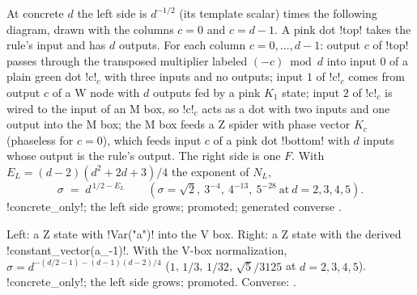 At concrete $d$ the left side is $d^{-1/2}$ (its template scalar) times the following diagram,
drawn with the columns $c=0$ and $c=d-1$. A pink dot \code!top! takes the rule's input and has
$d$ outputs. For each column $c=0,\dots,d-1$: output $c$ of \code!top! passes through the
transposed multiplier labeled $(-c)\bmod d$ into input $0$ of a plain green dot \code!c!$_c$ with
three inputs and no outputs; input $1$ of \code!c!$_c$ comes from output $c$ of a W node with $d$
outputs fed by a pink $K_1$ state; input $2$ of \code!c!$_c$ is wired to the input of an M box, so
\code!c!$_c$ acts as a dot with two inputs and one output into the M box; the M box feeds a Z
spider with phase vector $K_c$ (phaseless for $c=0$), which feeds input $c$ of a pink dot
\code!bottom! with $d$ inputs whose output is the rule's output. The right side is one $F$. With
$E_L=(d-2)(d^2+2d+3)/4$ the exponent of $N_L$,
\[
\sigma \;=\; d^{\,1/2-E_L}\qquad(\sigma=\sqrt2,\ 3^{-4},\ 4^{-13},\ 5^{-28}\ \text{at}\ d=2,3,4,5).
\]
\py!concrete_only!; the left side grows; promoted; generated converse .

Left: a Z state with \py!Var("a")! into the V box. Right: a Z state with the derived
\py!constant_vector(a_{-1})!. With the V-box normalization,
$\sigma=d^{-(d/2-1)-(d-1)(d-2)/4}$ ($1$, $1/3$, $1/32$, $\sqrt5/3125$ at $d=2,3,4,5$).
\py!concrete_only!; the left side grows; promoted. Converse: .

